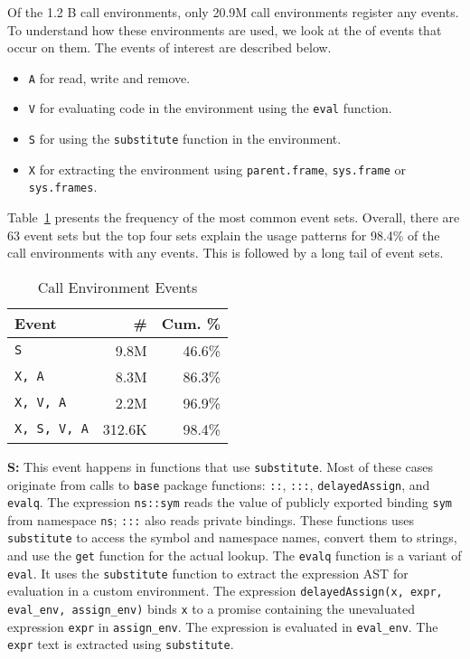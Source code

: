 \documentclass[10pt,review,sigplan,anonymous=true,authorversion=true,nonacm=true]{acmart}
\newcommand{\code}[1]{\lstinline |#1|\xspace}
\newcommand{\base}{\code{base}}
\newcommand{\eval}{\code{eval}}
\newcommand{\substitute}{\code{substitute}}
\begin{document}
Of the 1.2 B call environments, only 20.9M call environments register any
events. To understand how these environments are used, we look at the of events
that occur on them. The events of interest are described below.
\begin{itemize}
\item \texttt{A} for read, write and remove.
\item \texttt{V} for evaluating code in the environment using the \eval function.
\item \texttt{S} for using the \substitute function in the environment.
\item \texttt{X} for extracting the environment using \code{parent.frame},
  \code{sys.frame} or \code{sys.frames}.
\end{itemize}

Table~\ref{table:call_env_seq} presents the frequency of the most common event
sets. Overall, there are 63 event sets but the top four sets explain the
usage patterns for 98.4\% of the call environments with any events. This is
followed by a long tail of event sets.

\begin{table}[!h]
  \small
  \caption{Call Environment Events} \label{table:call_env_seq}
  \centering
  \begin{tabular}{lrr}
    \toprule
    \textbf{Event}&\textbf{\#}&\textbf{Cum. \%}\\
    \midrule
    \texttt{S}&9.8M&46.6\%\\
    \texttt{X, A}&8.3M&86.3\%\\
    \texttt{X, V, A}&2.2M&96.9\%\\
    \texttt{X, S, V, A}&312.6K&98.4\%\\
    \bottomrule
  \end{tabular}
\end{table}

\noindent
\textbf{S:} This event happens in functions that use \code{substitute}.
  Most of these cases originate from calls to \base package functions:
  \code{::}, \code{:::}, \code{delayedAssign}, and \code{evalq}. The expression
  \code{ns::sym} reads the value of publicly exported binding \code{sym} from
  namespace \code{ns}; \code{:::} also reads private bindings. These functions
  uses \substitute to access the symbol and namespace names, convert them to
  strings, and use the \code{get} function for the actual lookup. The
  \code{evalq} function is a variant of \eval. It uses the \substitute function
  to extract the expression AST for evaluation in a custom environment. The
  expression \code{delayedAssign(x, expr, eval_env, assign_env)} binds \code{x}
  to a promise containing the unevaluated expression \code{expr} in
  \code{assign_env}. The expression is evaluated in \code{eval_env}. The
  \code{expr} text is extracted using \code{substitute}.
\end{document}
